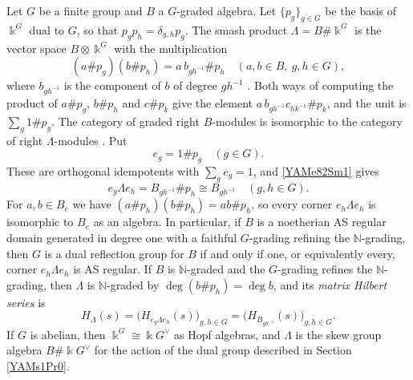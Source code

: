 \documentclass[reqno]{amsart}
\numberwithin{equation}{section}
\theoremstyle{definition}
\theoremstyle{remark}
\theoremstyle{plain}
\newcommand{\kk}{\Bbbk}
\begin{document}
Let $G$ be a finite group and $B$ a $G$-graded algebra. Let $\{p_g\}_{g\in G}$ be the basis of $\kk^G$ dual to $G$, so that $p_gp_h=\delta_{g,h}p_g$. The smash product $\Lambda=B\#\kk^G$ is the vector space $B\otimes\kk^G$ with the multiplication
\begin{equation}\label{YAMe82Sm1}
(a\#p_g)(b\#p_h)=a\,b_{gh^{-1}}\#p_h\quad(a,b\in B,\ g,h\in G),
\end{equation}
where $b_{gh^{-1}}$ is the component of $b$ of degree $gh^{-1}$ \cite[Proposition 1.4]{CoMo}. Both ways of computing the product of $a\#p_g$, $b\#p_h$ and $c\#p_k$ give the element $a\,b_{gh^{-1}}c_{hk^{-1}}\#p_k$, and the unit is $\sum_g1\#p_g$. The category of graded right $B$-modules is isomorphic to the category of right $\Lambda$-modules \cite[Theorem 2.2]{CoMo}. Put
\[
e_g=1\#p_g\quad(g\in G).
\]
These are orthogonal idempotents with $\sum_ge_g=1$, and \eqref{YAMe82Sm1} gives
\begin{equation}\label{YAMe84Co3}
e_g\Lambda e_h=B_{gh^{-1}}\#p_h\cong B_{gh^{-1}}\quad(g,h\in G).
\end{equation}
For $a,b\in B_e$ we have $(a\#p_h)(b\#p_h)=ab\#p_h$, so every corner $e_h\Lambda e_h$ is isomorphic to $B_e$ as an algebra. In particular, if $B$ is a noetherian AS regular domain generated in degree one with a faithful $G$-grading refining the $\mathbb N$-grading, then $G$ is a dual reflection group for $B$ if and only if one, or equivalently every, corner $e_h\Lambda e_h$ is AS regular. If $B$ is $\mathbb N$-graded and the $G$-grading refines the $\mathbb N$-grading, then $\Lambda$ is $\mathbb N$-graded by $\deg(b\#p_h)=\deg b$, and its \emph{matrix Hilbert series} is
\begin{equation}\label{YAMe85Mh4}
H_\Lambda(s)=\big(H_{e_g\Lambda e_h}(s)\big)_{g,h\in G}=\big(H_{B_{gh^{-1}}}(s)\big)_{g,h\in G}.
\end{equation}
If $G$ is abelian, then $\kk^G\cong\kk G^\vee$ as Hopf algebras, and $\Lambda$ is the skew group algebra $B\#\kk G^\vee$ for the action of the dual group described in Section \ref{YAMs1Pr0}.
\end{document}
